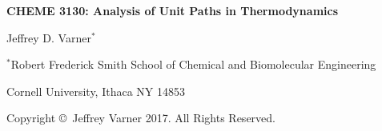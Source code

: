 \documentclass[11pt]{article}
\theoremstyle{definition}
\begin{document}
{\par\centering\textbf{\Large CHEME 3130: Analysis of Unit Paths in Thermodynamics}}
\vspace{0.2in}
{\par \centering \large{Jeffrey D. Varner$^{*}$}}
\vspace{0.05in}
{\par \centering \large{$^{*}$}Robert Frederick Smith School of Chemical and Biomolecular Engineering}
{\par \centering \large{Cornell University, Ithaca NY 14853}}
\vspace{0.1in}
{\par \centering \small{Copyright \copyright\ Jeffrey Varner 2017. All Rights Reserved.}}\\

\date{}
\thispagestyle{empty}

\setcounter{page}{1}
\end{document}
